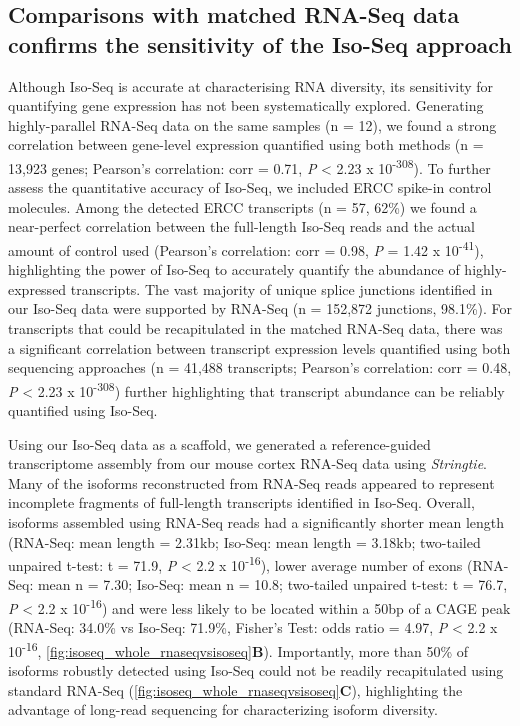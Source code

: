 	
\newpage
\subsection{Comparisons with matched RNA-Seq data confirms the sensitivity of the Iso-Seq approach} 
\label{sec: whole_isoseqvsrnaseq}
Although Iso-Seq is accurate at characterising RNA diversity\cite{Wang2019}, its sensitivity for quantifying gene expression has not been systematically explored. Generating highly-parallel RNA-Seq data on the same samples (n = 12), we found a strong correlation between gene-level expression quantified using both methods (n = 13,923 genes; Pearson's correlation: corr = 0.71, \textit{P} < 2.23 x 10\textsuperscript{-308}). To further assess the quantitative accuracy of Iso-Seq, we included ERCC spike-in control molecules. Among the detected ERCC transcripts (n = 57, 62\%) we found a near-perfect correlation between the full-length Iso-Seq reads and the actual amount of control used (Pearson's correlation: corr = 0.98, \textit{P} = 1.42 x 10\textsuperscript{-41}), highlighting the power of Iso-Seq to accurately quantify the abundance of highly-expressed transcripts. The vast majority of unique splice junctions identified in our Iso-Seq data were supported by RNA-Seq (n = 152,872 junctions, 98.1\%). For transcripts that could be recapitulated in the matched RNA-Seq data, there was a significant correlation between transcript expression levels quantified using both sequencing approaches (n = 41,488 transcripts; Pearson's correlation: corr = 0.48, \textit{P} < 2.23 x 10\textsuperscript{-308}) further highlighting that transcript abundance can be reliably quantified using Iso-Seq. 

Using our Iso-Seq data as a scaffold, we generated a reference-guided transcriptome assembly from our mouse cortex RNA-Seq data using \textit{Stringtie}\cite{Pertea2015}. Many of the isoforms reconstructed from RNA-Seq reads appeared to represent incomplete fragments of full-length transcripts identified in Iso-Seq. Overall, isoforms assembled using RNA-Seq reads had a significantly shorter mean length (RNA-Seq: mean length = 2.31kb; Iso-Seq: mean length = 3.18kb; two-tailed unpaired t-test: t = 71.9, \textit{P} < 2.2 x 10\textsuperscript{-16}), lower average number of exons (RNA-Seq: mean n = 7.30; Iso-Seq: mean n = 10.8; two-tailed unpaired t-test: t = 76.7, \textit{P} < 2.2 x 10\textsuperscript{-16}) and were less likely to be located within a 50bp of a CAGE peak (RNA-Seq: 34.0\% vs Iso-Seq: 71.9\%, Fisher’s Test: odds ratio = 4.97, \textit{P} < 2.2 x 10\textsuperscript{-16}, \cref{fig:isoseq_whole_rnaseqvsisoseq}\textbf{B}). Importantly, more than 50\% of isoforms robustly detected using Iso-Seq could not be readily recapitulated using standard RNA-Seq (\cref{fig:isoseq_whole_rnaseqvsisoseq}\textbf{C}), highlighting the advantage of long-read sequencing for characterizing isoform diversity.%

